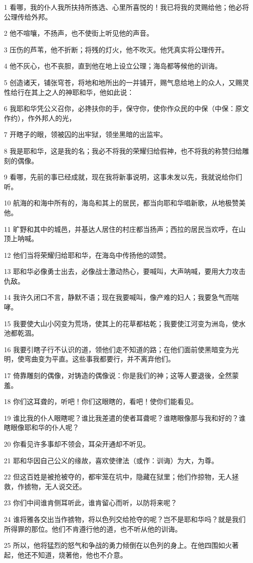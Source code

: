 \par 1 看哪，我的仆人我所扶持所拣选、心里所喜悦的！我已将我的灵赐给他；他必将公理传给外邦。
\par 2 他不喧嚷，不扬声，也不使街上听见他的声音。
\par 3 压伤的芦苇，他不折断；将残的灯火，他不吹灭。他凭真实将公理传开。
\par 4 他不灰心，也不丧胆，直到他在地上设立公理；海岛都等候他的训诲。
\par 5 创造诸天，铺张穹苍，将地和地所出的一并铺开，赐气息给地上的众人，又赐灵性给行在其上之人的神耶和华，他如此说：
\par 6 我耶和华凭公义召你，必搀扶你的手，保守你，使你作众民的中保（中保：原文作约），作外邦人的光，
\par 7 开瞎子的眼，领被囚的出牢狱，领坐黑暗的出监牢。
\par 8 我是耶和华，这是我的名；我必不将我的荣耀归给假神，也不将我的称赞归给雕刻的偶像。
\par 9 看哪，先前的事已经成就，现在我将新事说明，这事未发以先，我就说给你们听。
\par 10 航海的和海中所有的，海岛和其上的居民，都当向耶和华唱新歌，从地极赞美他。
\par 11 旷野和其中的城邑，并基达人居住的村庄都当扬声；西拉的居民当欢呼，在山顶上呐喊。
\par 12 他们当将荣耀归给耶和华，在海岛中传扬他的颂赞。
\par 13 耶和华必像勇士出去，必像战士激动热心，要喊叫，大声呐喊，要用大力攻击仇敌。
\par 14 我许久闭口不言，静默不语；现在我要喊叫，像产难的妇人；我要急气而喘哮。
\par 15 我要使大山小冈变为荒场，使其上的花草都枯乾；我要使江河变为洲岛，使水池都乾涸。
\par 16 我要引瞎子行不认识的道，领他们走不知道的路；在他们面前使黑暗变为光明，使弯曲变为平直。这些事我都要行，并不离弃他们。
\par 17 倚靠雕刻的偶像，对铸造的偶像说：你是我们的神；这等人要退後，全然蒙羞。
\par 18 你们这耳聋的，听吧！你们这眼瞎的，看吧！使你们能看见。
\par 19 谁比我的仆人眼瞎呢？谁比我差遣的使者耳聋呢？谁瞎眼像那与我和好的？谁瞎眼像耶和华的仆人呢？
\par 20 你看见许多事却不领会，耳朵开通却不听见。
\par 21 耶和华因自己公义的缘故，喜欢使律法（或作：训诲）为大，为尊。
\par 22 但这百姓是被抢被夺的，都牢笼在坑中，隐藏在狱里；他们作掠物，无人拯救，作掳物，无人说交还。
\par 23 你们中间谁肯侧耳听此，谁肯留心而听，以防将来呢？
\par 24 谁将雅各交出当作掳物，将以色列交给抢夺的呢？岂不是耶和华吗？就是我们所得罪的那位。他们不肯遵行他的道，也不听从他的训诲。
\par 25 所以，他将猛烈的怒气和争战的勇力倾倒在以色列的身上。在他四围如火著起，他还不知道，烧著他，他也不介意。

